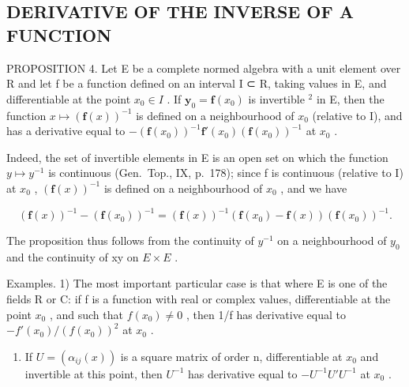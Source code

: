 \subsection{DERIVATIVE OF THE INVERSE OF A FUNCTION}

PROPOSITION 4. Let E be a complete normed algebra with a unit element over R and let f be a function defined on an interval I ⊂ R, taking values in E, and differentiable at the point \(x_{0} \in I\) . If \(\mathbf{y}_{0} = \mathbf{f}(x_{0})\) is invertible \(^{2}\) in E, then the function \(x \mapsto (\mathbf{f}(x))^{-1}\) is defined on a neighbourhood of \(x_{0}\) (relative to I), and has a derivative equal to \(-\left(\mathbf{f}(x_{0})\right)^{-1}\mathbf{f}'(x_{0})\left(\mathbf{f}(x_{0})\right)^{-1}\) at \(x_{0}\) .

Indeed, the set of invertible elements in E is an open set on which the function \(y \mapsto y^{-1}\) is continuous (Gen.~Top., IX, p.~178); since f is continuous (relative to I) at \(x_{0}\) , \(\left(\mathbf{f}(x)\right)^{-1}\) is defined on a neighbourhood of \(x_{0}\) , and we have

\[
\left(\mathbf {f} (x)\right) ^ {- 1} - \left(\mathbf {f} \left(x _ {0}\right)\right) ^ {- 1} = \left(\mathbf {f} (x)\right) ^ {- 1} \left(\mathbf {f} \left(x _ {0}\right) - \mathbf {f} (x)\right) \left(\mathbf {f} \left(x _ {0}\right)\right) ^ {- 1}.
\]

The proposition thus follows from the continuity of \(y^{-1}\) on a neighbourhood of \(y_{0}\) and the continuity of xy on \(E \times E\) .

Examples. 1) The most important particular case is that where E is one of the fields R or C: if f is a function with real or complex values, differentiable at the point \(x_{0}\) , and such that \(f(x_{0}) \neq 0\) , then 1/f has derivative equal to \(-f'(x_{0})/(f(x_{0}))^{2}\) at \(x_{0}\) .

\begin{enumerate}
\def\labelenumi{\arabic{enumi})}
\setcounter{enumi}{1}
\tightlist
\item
  If \(U = (\alpha_{ij}(x))\) is a square matrix of order n, differentiable at \(x_{0}\) and invertible at this point, then \(U^{-1}\) has derivative equal to \(-U^{-1}U'U^{-1}\) at \(x_{0}\) .
\end{enumerate}

